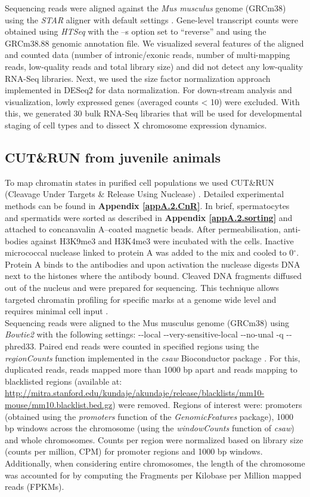 Sequencing reads were aligned against the \textit{Mus musculus} genome (GRCm38) using the \emph{STAR} aligner with default settings \citep{Dobin2013}. Gene-level transcript counts were obtained using \emph{HTSeq} \citep{Anders2014} with the –s option set to “reverse” and using the GRCm38.88 genomic annotation file. We visualized several features of the aligned and counted data (number of intronic/exonic reads, number of multi-mapping reads, low-quality reads and total library size) and did not detect any low-quality RNA-Seq libraries. Next, we used the size factor normalization approach implemented in DESeq2 \citep{Love2014} for data normalization. For down-stream analysis and visualization, lowly expressed genes (averaged counts < 10) were excluded. With this, we generated 30 bulk RNA-Seq libraries that will be used for developmental staging of cell types and to dissect X chromosome expression dynamics.

\subsection{CUT\&{}RUN from juvenile animals}

To map chromatin states in purified cell populations we used CUT\&{}RUN (Cleavage Under Targets \& Release Using Nuclease) \citep{Skene2018}. Detailed experimental methods can be found in \textbf{Appendix \ref{appA.2.CnR}}. In brief, spermatocytes and spermatids were sorted as described in \textbf{Appendix \ref{appA.2.sorting}} and attached to concanavalin A–coated magnetic beads. After permeabilisation, anti-bodies against H3K9me3 and H3K4me3 were incubated with the cells. Inactive micrococcal nuclease linked to protein A was added to the mix and cooled to 0$^\circ$. Protein A binds to the antibodies and upon activation the nuclease digests DNA next to the histones where the antibody bound. Cleaved DNA fragments diffused out of the nucleus and were prepared for sequencing. This technique allows targeted chromatin profiling for specific marks at a genome wide level and requires minimal cell input \citep{Skene2018}.\\

Sequencing reads were aligned to the Mus musculus genome (GRCm38) using \textit{Bowtie2} with the following settings: -{}-local -{}-very-sensitive-local -{}-no-unal -q -{}-phred33. Paired end reads were counted in specified regions using the \textit{regionCounts} function implemented in the \textit{csaw} Bioconductor package \citep{Lun2015}. For this, duplicated reads, reads mapped more than 1000 bp apart and reads mapping to blacklisted regions (available at: \url{http://mitra.stanford.edu/kundaje/akundaje/release/blacklists/mm10-mouse/mm10.blacklist.bed.gz}) were removed. Regions of interest were: promoters (obtained using the \textit{promoters} function of the \textit{GenomicFeatures} package), 1000 bp windows across the chromosome (using the \textit{windowCounts} function of \textit{csaw}) and whole chromosomes. Counts per region were normalized based on library size (counts per million, CPM) for promoter regions and 1000 bp windows. Additionally, when considering entire chromosomes, the length of the chromosome was accounted for by computing the Fragments per Kilobase per Million mapped reads (FPKMs). 

